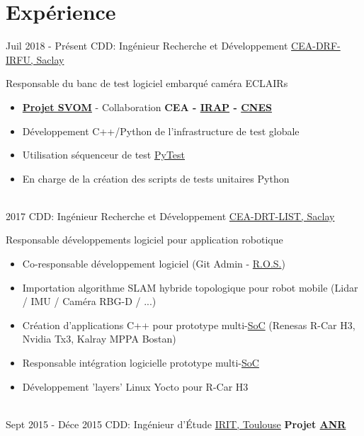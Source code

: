 \documentclass[letterpaper]{twentysecondcv} %
\begin{document}
\section{Expérience}
\begin{twenty} %
  \twentyitem
  {Juil 2018 -}
  {Présent}
  {CDD: Ingénieur Recherche et Développement}
  {\href{http://www.cea.fr/}{CEA-DRF-IRFU, Saclay}}
  {}
  {
    Responsable du banc de test logiciel embarqué caméra ECLAIRs
    \begin{itemize}
    \item \textbf{\href{http://www.svom.fr/}{Projet SVOM}} - Collaboration
      \textbf{CEA - \href{http://www.irap.omp.eu/}{IRAP} - \href{https://cnes.fr/fr}{CNES} }     
    \item Développement C++/Python de l'infrastructure de test globale
    \item Utilisation séquenceur de test \href{https://docs.pytest.org/en/latest/contents.html}{PyTest}
    \item En charge de la création des scripts de tests unitaires Python
    \end{itemize}
  }
  \\
  \twentyitem
  {2017}
  {}
  {CDD: Ingénieur Recherche et Développement}
  {\href{http://www.cea.fr/}{CEA-DRT-LIST, Saclay}}
  {}
  {
    Responsable développements logiciel pour application robotique
    \begin{itemize}
    \item Co-responsable développement logiciel (Git Admin - \href{http://www.ros.org/}{R.O.S.})
    \item Importation algorithme SLAM hybride topologique pour robot mobile (Lidar / IMU / Caméra RBG-D / ...)
    \item Création d'applications C++ pour prototype
      multi-\href{https://en.wikipedia.org/wiki/System_on_a_chip}{SoC} (Renesas R-Car
      H3, Nvidia Tx3, Kalray MPPA Bostan)
    \item Responsable intégration logicielle prototype
      multi-\href{https://en.wikipedia.org/wiki/System_on_a_chip}{SoC}
    \item Développement 'layers' Linux Yocto pour R-Car H3
    \end{itemize}
  }
  \\
  \twentyitem
  {Sept 2015 -}
  {Déce 2015}
  {CDD: Ingénieur d'Étude}
  {\href{http://www.cea.fr/}{IRIT, Toulouse}}
  {}
  {
    \textbf{Projet
      \href{http://www.agence-nationale-recherche.fr/Project-ANR-12-CORD-0003}{ANR
}}}
\end{twenty}
\end{document}
